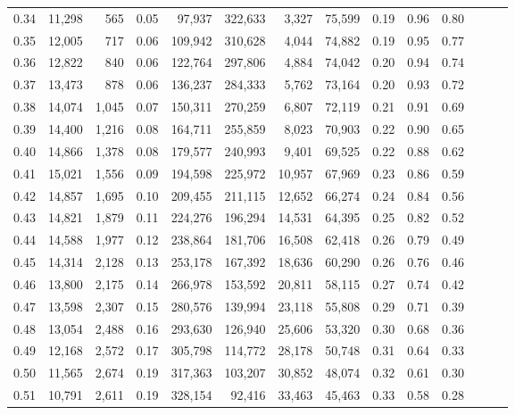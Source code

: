 \begin{tabular}{rrrrrrrrrrrrrr}
0.34 &  11,298 &    565 &  0.05 &   97,937 &  322,633 &   3,327 &  75,599 &  0.19 &  0.96 &      0.80 \\
0.35 &  12,005 &    717 &  0.06 &  109,942 &  310,628 &   4,044 &  74,882 &  0.19 &  0.95 &      0.77 \\
0.36 &  12,822 &    840 &  0.06 &  122,764 &  297,806 &   4,884 &  74,042 &  0.20 &  0.94 &      0.74 \\
0.37 &  13,473 &    878 &  0.06 &  136,237 &  284,333 &   5,762 &  73,164 &  0.20 &  0.93 &      0.72 \\
0.38 &  14,074 &  1,045 &  0.07 &  150,311 &  270,259 &   6,807 &  72,119 &  0.21 &  0.91 &      0.69 \\
0.39 &  14,400 &  1,216 &  0.08 &  164,711 &  255,859 &   8,023 &  70,903 &  0.22 &  0.90 &      0.65 \\
0.40 &  14,866 &  1,378 &  0.08 &  179,577 &  240,993 &   9,401 &  69,525 &  0.22 &  0.88 &      0.62 \\
0.41 &  15,021 &  1,556 &  0.09 &  194,598 &  225,972 &  10,957 &  67,969 &  0.23 &  0.86 &      0.59 \\
0.42 &  14,857 &  1,695 &  0.10 &  209,455 &  211,115 &  12,652 &  66,274 &  0.24 &  0.84 &      0.56 \\
0.43 &  14,821 &  1,879 &  0.11 &  224,276 &  196,294 &  14,531 &  64,395 &  0.25 &  0.82 &      0.52 \\
0.44 &  14,588 &  1,977 &  0.12 &  238,864 &  181,706 &  16,508 &  62,418 &  0.26 &  0.79 &      0.49 \\
0.45 &  14,314 &  2,128 &  0.13 &  253,178 &  167,392 &  18,636 &  60,290 &  0.26 &  0.76 &      0.46 \\
0.46 &  13,800 &  2,175 &  0.14 &  266,978 &  153,592 &  20,811 &  58,115 &  0.27 &  0.74 &      0.42 \\
0.47 &  13,598 &  2,307 &  0.15 &  280,576 &  139,994 &  23,118 &  55,808 &  0.29 &  0.71 &      0.39 \\
0.48 &  13,054 &  2,488 &  0.16 &  293,630 &  126,940 &  25,606 &  53,320 &  0.30 &  0.68 &      0.36 \\
0.49 &  12,168 &  2,572 &  0.17 &  305,798 &  114,772 &  28,178 &  50,748 &  0.31 &  0.64 &      0.33 \\
0.50 &  11,565 &  2,674 &  0.19 &  317,363 &  103,207 &  30,852 &  48,074 &  0.32 &  0.61 &      0.30 \\
0.51 &  10,791 &  2,611 &  0.19 &  328,154 &   92,416 &  33,463 &  45,463 &  0.33 &  0.58 &      0.28 \\

\end{tabular}
